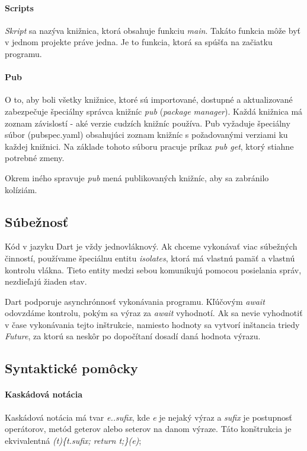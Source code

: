 \paragraph{Scripts}
\emph{Skript} sa nazýva knižnica, ktorá obsahuje funkciu \emph{main}. Takáto funkcia môže byť v jednom projekte práve jedna. Je to funkcia, ktorá sa spúšťa na začiatku programu.

\paragraph{Pub}
O to, aby boli všetky knižnice, ktoré sú importované, dostupné a aktualizované zabezpečuje špeciálny správca knižníc \emph{pub} (\emph{package manager}). 
Každá knižnica má zoznam závislostí - aké verzie cudzích knižníc používa. 
Pub vyžaduje špeciálny súbor (pubspec.yaml) obsahujúci zoznam knižníc s požadovanými verziami ku každej knižnici. Na základe tohoto súboru pracuje príkaz \emph{pub get}, ktorý stiahne potrebné zmeny.

Okrem iného spravuje \emph{pub} mená publikovaných knižníc, aby sa zabránilo kolíziám.

\subsection{Súbežnosť}%
Kód v jazyku Dart je vždy jednovláknový. Ak chceme vykonávať viac súbežných činností, používame špeciálnu entitu \emph{isolates}, ktorá má vlastnú pamäť a vlastnú kontrolu vlákna. Tieto entity medzi sebou komunikujú pomocou posielania správ, nezdieľajú žiaden stav.

Dart podporuje asynchrónnosť vykonávania programu. Kľúčovým \emph{await} odovzdáme kontrolu, pokým sa výraz za \emph{await} vyhodnotí. Ak sa nevie vyhodnotiť v čase vykonávania tejto inštrukcie, namiesto hodnoty sa vytvorí inštancia triedy \emph{Future}, za ktorú sa neskôr po dopočítaní dosadí daná hodnota výrazu.%


\subsection{Syntaktické pomôcky}

\paragraph{Kaskádová notácia}
Kaskádová notácia má tvar \emph{e..sufix}, kde \emph{e} je nejaký výraz a \emph{sufix} je postupnosť operátorov, metód geterov alebo seterov na danom výraze. Táto konštrukcia je ekvivalentná \emph{(t)\{t.sufix; return t;\}(e)};

